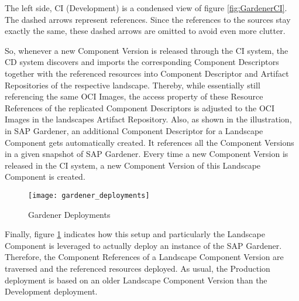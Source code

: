 The left side, CI (Development) is a condensed view of figure \ref{fig:GardenerCI}. The dashed arrows represent references. Since the references to the sources stay exactly the same, these dashed arrows are omitted to avoid even more clutter.\par 
So, whenever a new Component Version is released through the CI system, the CD system discovers and imports the corresponding Component Descriptors together with the referenced resources into Component Descriptor and Artifact Repositories of the respective landscape. Thereby, while essentially still referencing the same OCI Images, the access property of these Resource References of the replicated Component Descriptors is adjusted to the OCI Images in the landscapes Artifact Repository. Also, as shown in the illustration, in SAP Gardener, an additional Component Descriptor for a Landscape Component gets automatically created. It references all the Component Versions in a given snapshot of SAP Gardener. Every time a new Component Version is released in the CI system, a new Component Version of this Landscape Component is created.\par 

\begin{figure}[H]
	\centering
	\texttt{[image: gardener\_deployments]}
	\caption[Gardener Deployments]{Gardener Deployments }
	\label{fig:GardenerDeployments}
\end{figure}

Finally, figure \ref{fig:GardenerDeployments} indicates how this setup and particularly the Landscape Component is leveraged to actually deploy an instance of the SAP Gardener. Therefore, the Component References of a Landscape Component Version are traversed and the referenced resources deployed. As usual, the Production deployment is based on an older Landscape Component Version than the Development deployment. 


